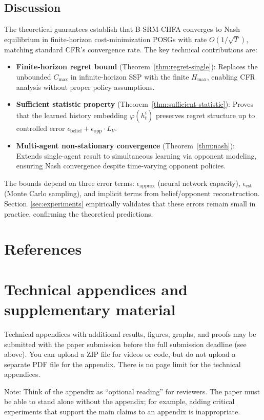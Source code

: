 \documentclass{article}
\begin{document}
\subsection{Discussion}

The theoretical guarantees establish that B-SRM-CHFA converges to Nash equilibrium in finite-horizon cost-minimization POSGs with rate $O(1/\sqrt{T})$, matching standard CFR's convergence rate. The key technical contributions are:

\begin{itemize}
    \item \textbf{Finite-horizon regret bound} (Theorem~\ref{thm:regret-single}): Replaces the unbounded $C_{\max}$ in infinite-horizon SSP with the finite $H_{\max}$, enabling CFR analysis without proper policy assumptions.
    
    \item \textbf{Sufficient statistic property} (Theorem~\ref{thm:sufficient-statistic}): Proves that the learned history embedding $\varphi(h_t^i)$ preserves regret structure up to controlled error $\epsilon_{\text{belief}} + \epsilon_{\text{opp}} \cdot L_V$.
    
    \item \textbf{Multi-agent non-stationary convergence} (Theorem~\ref{thm:nash}): Extends single-agent result to simultaneous learning via opponent modeling, ensuring Nash convergence despite time-varying opponent policies.
\end{itemize}

The bounds depend on three error terms: $\epsilon_{\text{approx}}$ (neural network capacity), $\epsilon_{\text{est}}$ (Monte Carlo sampling), and implicit terms from belief/opponent reconstruction. Section~\ref{sec:experiments} empirically validates that these errors remain small in practice, confirming the theoretical predictions.

\section*{References}
{\small

}



\appendix

\section{Technical appendices and supplementary material}
Technical appendices with additional results, figures, graphs, and proofs may be submitted with the paper submission before the full submission deadline (see above). You can upload a ZIP file for videos or code, but do not upload a separate PDF file for the appendix. There is no page limit for the technical appendices. 

Note: Think of the appendix as ``optional reading'' for reviewers. The paper must be able to stand alone without the appendix; for example, adding critical experiments that support the main claims to an appendix is inappropriate. 


\newpage

\end{document}
